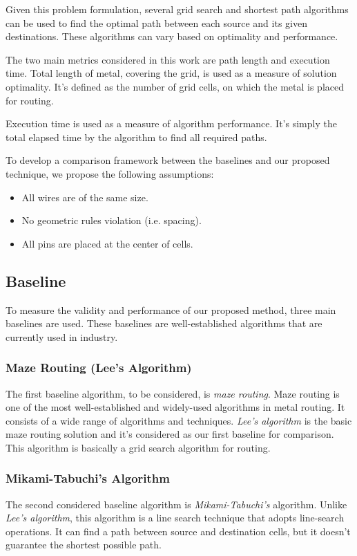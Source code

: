 Given this problem formulation, several grid search and shortest path algorithms can be used to find the optimal path between each source and its given destinations. These algorithms can vary based on optimality and performance.

The two main metrics considered in this work are path length and execution time. Total length of metal, covering the grid, is used as a measure of solution optimality. It's defined as the number of grid cells, on which the metal is placed for routing.

Execution time is used as a measure of algorithm performance. It's simply the total elapsed time by the algorithm to find all required paths.

To develop a comparison framework between the baselines and our proposed technique, we propose the following assumptions:
\begin{itemize}
    \item All wires are of the same size.
    \item No geometric rules violation (i.e. spacing).
    \item All pins are placed at the center of cells.
\end{itemize}

\subsection{Baseline}
To measure the validity and performance of our proposed method, three main baselines are used. These baselines are well-established algorithms that are currently used in industry.

\subsubsection{Maze Routing (Lee's Algorithm)}
The first baseline algorithm, to be considered, is \emph{maze routing}. Maze routing is one of the most well-established and widely-used algorithms in metal routing. It consists of a wide range of algorithms and techniques. \emph{Lee's algorithm} is the basic maze routing solution and it's considered as our first baseline for comparison. This algorithm is basically a grid search algorithm for routing.

\subsubsection{Mikami-Tabuchi’s Algorithm}
The second considered baseline algorithm is \emph{Mikami-Tabuchi’s} algorithm. Unlike \emph{Lee's algorithm}, this algorithm is a line search technique that adopts line-search operations. It can find a path between source and destination cells, but it doesn't guarantee the shortest possible path.   

